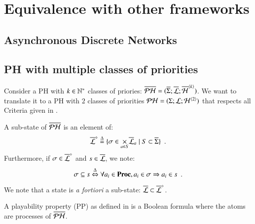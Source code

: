 \section{ Equivalence with other frameworks}

\subsection{Asynchronous Discrete Networks}

\subsection{PH with multiple classes of priorities}

\newcommand{\ov}{\overline}
\newcommand{\os}{\ov{s}}
\newcommand{\oPH}{\ov{\PH}}

\newcommand{\F}{F}
\newcommand{\Fopsymbol}{\F}
\newcommand{\Fop}[1]{\Fopsymbol(#1)}
\newcommand{\Fsem}[2]{\left[#1\right](#2)}
\newcommand{\mysigma}{\sigma}

Consider a PH with $k \in \mathbb{N}^*$ classes of priories:
$\ov{\PH} = (\ov{\PHs}; \ov{\PHl}; \ov{\PHa}^{\angles{k}})$.
We want to translate it to a PH with $2$ classes of priorities
$\mathcal{PH} = (\Sigma; \mathcal{L}; \mathcal{H}^{{\langle 2 \rangle}})$
that respects all Criteria given in .

\newcommand{\PHsubl}[1][\ov{\PHl}]{#1^\diamond}

\begin{definition}[Sub-states ($\PHsubl$)]
  A sub-state of $\oPH$ is an element of:
    \[\PHsubl \DEF \{ \mysigma \in \bigtimes{a \in S} \ov{\PHl}_a \mid S \subset \ov{\PHs} \} \enspace.\]
  Furthermore, if $\mysigma \in \PHsubl$ and $s \in \ov{\PHl}$, we note:
    \[\mysigma \subseteq s \EQDEF \forall a_i \in \Proc, a_i \in \mysigma \Rightarrow a_i \in s \enspace.\]
\end{definition}

We note that a state is \textit{a fortiori} a sub-state: $\ov{\PHl} \subset \PHsubl$.

A playability property (PP) as defined in  is a Boolean formula where the atoms are processes of $\ov{\PH}$.

